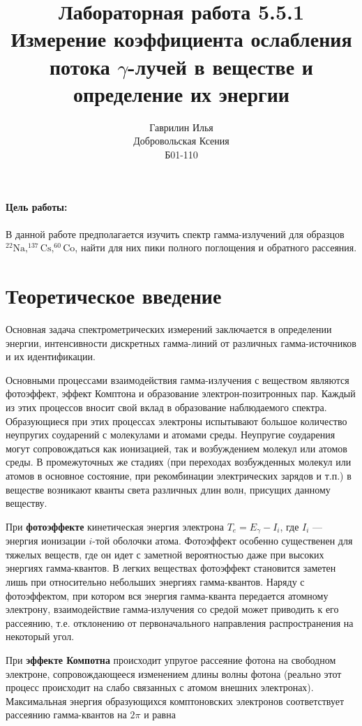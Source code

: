 \documentclass[a4paper,12pt]{article} %
\author{Гаврилин Илья\\
	Добровольская Ксения\\
	Б01-110}
\title{\textbf{Лабораторная работа 5.5.1\\ 
		Измерение коэффициента ослабления потока $\gamma$-лучей в веществе и определение их энергии}}
\newcommand{\ga}{\ensuremath{\gamma}}
\begin{document}
	\maketitle
	
	\paragraph*{Цель работы:} В данной работе предполагается изучить спектр гамма-излучений для образцов $ \mathrm{^{22}Na, ^{137}Cs, ^{60}Co }$, найти для них пики полного поглощения и обратного рассеяния.
	
	
	
	\section{Теоретическое введение}
	
	Основная задача спектрометрических измерений заключается в определении энергии, интенсивности дискретных гамма-линий от различных гамма-источников и их идентификации.
	
	Основными процессами взаимодействия гамма-излучения с веществом являются фотоэффект, эффект Комптона и образование электрон-позитронных пар. Каждый из этих процессов вносит свой вклад в образование наблюдаемого спектра. Образующиеся при этих процессах электроны испытывают большое количество неупругих соударений с молекулами и атомами среды. Неупругие соударения могут сопровождаться как ионизацией, так и возбуждением молекул или атомов среды. В промежуточных же стадиях (при переходах возбужденных молекул или атомов в основное состояние, при рекомбинации электрических зарядов и т.п.) в веществе возникают кванты света различных длин волн, присущих данному веществу.
	
	При \textbf{фотоэффекте} кинетическая энергия электрона $ T_e = E_\ga - I_i $, где $ I_i $ --- энергия ионизации $ i $-той оболочки атома. Фотоэффект особенно существенен для тяжелых веществ, где он идет с заметной вероятностью даже при высоких энергиях гамма-квантов. В легких веществах фотоэффект становится заметен лишь при относительно небольших энергиях гамма-квантов. Наряду с фотоэффектом, при котором вся энергия гамма-кванта передается атомному электрону, взаимодействие гамма-излучения со средой может приводить к его рассеянию, т.е. отклонению от первоначального направления распространения на некоторый угол.
	
	При \textbf{эффекте Компотна} происходит упругое рассеяние фотона на свободном электроне, сопровождающееся изменением длины волны фотона (реально этот процесс происходит на слабо связанных с атомом внешних электронах). Максимальная энергия образующихся комптоновских электронов соответствует рассеянию гамма-квантов на $ 2\pi $ и равна
	
\end{document}
